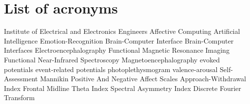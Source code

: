 \chapter{List of acronyms}

\begin{acronym}[TDMAAA]
					{Institute of Electrical and Electronics Engineers}
					{Affective Computing}	
					{Artificial Intelligence}
    			   {Emotion-Recognition}
    			   {Brain-Computer Interface}
    			   {Brain-Computer Interfaces}
    			   {Electroencephalography}
               {Functional Magnetic Resonance Imaging}
              {Functional Near-Infrared Spectroscopy}
               {Magnetoencephalography}
               {evoked potentials}
    		  {event-related potentials}
            {photoplethysmogram}
            {valence-arousal}
    		{Self-Assessment Mannikin}
    		{Positive And Negative Affect Scales}
    		{Approach-Withdrawal Index}
    		{Frontal Midline Theta Index}
    		{Spectral Asymmetry Index}
    		{Discrete Fourier Transform}

\end{acronym}

